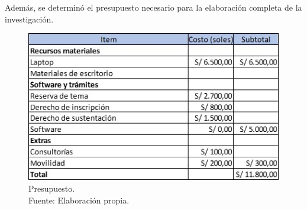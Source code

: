 Además, se determinó el presupuesto necesario para la elaboración completa de la investigación.

\begin{figure}[!ht]
	\begin{center}
		\includegraphics[width=1.00\textwidth]{3/figures/presupuesto.jpg}
		\caption[Presupuesto]{Presupuesto.\\
			Fuente: Elaboración propia.}
		\label{3:fig303}
	\end{center}
\end{figure}



